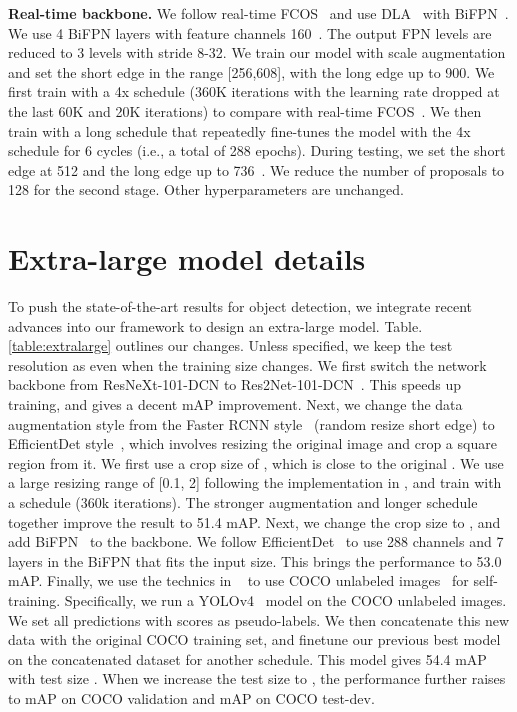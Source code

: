 \documentclass{article}
\begin{document}
\noindent \textbf{Real-time backbone.}
We follow real-time FCOS~\cite{tian2020fcos} and use DLA~\cite{yu2018deep} with BiFPN~\cite{tan2020efficientdet}.
We use 4 BiFPN layers with feature channels 160~\cite{tian2020fcos}.
The output FPN levels are reduced to 3 levels with stride 8-32.
We train our model with scale augmentation and set the short edge in the range [256,608], with the long edge up to 900.
We first train with a 4x schedule (360K iterations with the learning rate dropped at the last 60K and 20K iterations) to compare with real-time FCOS~\cite{tian2020fcos}.
We then train with a long schedule that repeatedly fine-tunes the model with the 4x schedule for 6 cycles (i.e., a total of 288 epochs).
During testing, we set the short edge at 512 and the long edge up to 736~\cite{tian2020fcos}.
We reduce the number of proposals to 128 for the second stage.
Other hyperparameters are unchanged.




\section{Extra-large model details}
To push the state-of-the-art results for object detection, we integrate recent advances into our framework to design an extra-large model.
Table.\ref{table:extralarge} outlines our changes.
Unless specified, we keep the test resolution as  even when the training size changes.
We first switch the network backbone from ResNeXt-101-DCN to Res2Net-101-DCN~\cite{gao2019res2net}. This speeds up training, and gives a decent  mAP improvement.
Next, we change the data augmentation style from the Faster RCNN style~\cite{wu2019detectron2,mmdetection} (random resize short edge) to EfficientDet style~\cite{tan2020efficientdet}, which involves resizing the original image and crop a square region from it. 
We first use a crop size of , which is close to the original . 
We use a large resizing range of [0.1, 2] following the implementation in \citet{wightman2020}, and train with a  schedule (360k iterations).
The stronger augmentation and longer schedule together improve the result to 51.4 mAP.
Next, we change the crop size to , and add BiFPN~\cite{tan2020efficientdet} to the backbone. We follow EfficientDet~\cite{tan2020efficientdet} to use 288 channels and 7 layers in the BiFPN that fits the  input size.
This brings the performance to 53.0 mAP.
Finally, we use the technics in ~\citet{zoph2020rethinking} to use COCO unlabeled images~\cite{lin2014coco} for self-training.
Specifically, we run a YOLOv4~\cite{wang2020scaled} model on the COCO unlabeled images. 
We set all predictions with scores  as pseudo-labels.
We then concatenate this new data with the original COCO training set, and finetune our previous best model on the concatenated dataset for another  schedule.
This model gives 54.4 mAP with test size .
When we increase the test size to , the performance further raises to  mAP on COCO validation and  mAP on COCO test-dev.
\end{document}
